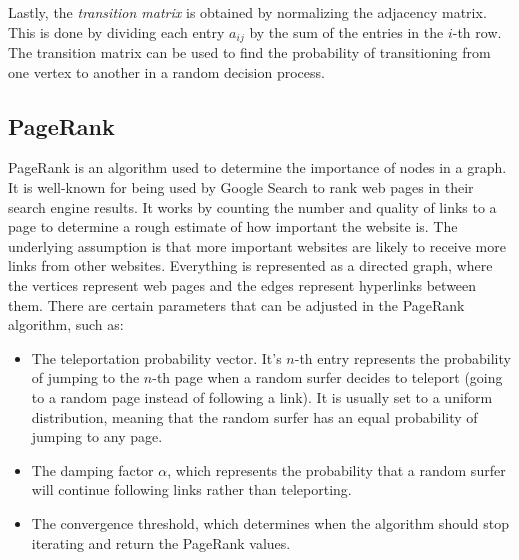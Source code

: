 Lastly, the \emph{transition matrix} is obtained by normalizing the adjacency matrix. This is done by dividing each entry $a_{ij}$ by the sum of the entries in the $i$-th row. The transition matrix can be used to find the probability of transitioning from one vertex to another in a random decision process.


\subsection{PageRank}

PageRank is an algorithm used to determine the importance of nodes in a graph. It is well-known for being used by Google Search to rank web pages in their search engine results. It works by counting the number and quality of links to a page to determine a rough estimate of how important the website is. The underlying assumption is that more important websites are likely to receive more links from other websites. Everything is represented as a directed graph, where the vertices represent web pages and the edges represent hyperlinks between them. There are certain parameters that can be adjusted in the PageRank algorithm, such as:
\begin{itemize}
    \item The teleportation probability vector. It's $n$-th entry represents the probability of jumping to the $n$-th page when a random surfer decides to teleport (going to a random page instead of following a link). It is usually set to a uniform distribution, meaning that the random surfer has an equal probability of jumping to any page.
    \item The damping factor $\alpha$, which represents the probability that a random surfer will continue following links rather than teleporting.
    \item The convergence threshold, which determines when the algorithm should stop iterating and return the PageRank values.
\end{itemize}

